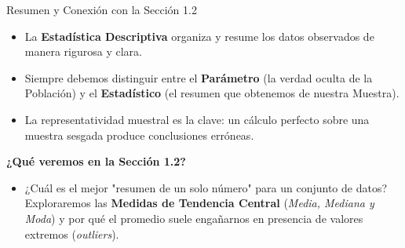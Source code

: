 \begin{frame}{Resumen y Conexión con la Sección 1.2}
  \begin{itemize}
    \item La \textbf{Estadística Descriptiva} organiza y resume los datos observados de manera rigurosa y clara. \pause
    \item Siempre debemos distinguir entre el \textbf{Parámetro} (la verdad oculta de la Población) y el \textbf{Estadístico} (el resumen que obtenemos de nuestra Muestra). \pause
    \item La representatividad muestral es la clave: un cálculo perfecto sobre una muestra sesgada produce conclusiones erróneas.
  \end{itemize}

  \vspace{0.6em}
  \pause
  {\large \color{TecAzulOscuro}\textbf{¿Qué veremos en la Sección 1.2?}}
  \vspace{0.2em}
  \begin{itemize}
    \item ¿Cuál es el mejor "resumen de un solo número" para un conjunto de datos? Exploraremos las \textbf{Medidas de Tendencia Central} (\emph{Media, Mediana y Moda}) y por qué el promedio suele engañarnos en presencia de valores extremos (\emph{outliers}).
  \end{itemize}
\end{frame}


